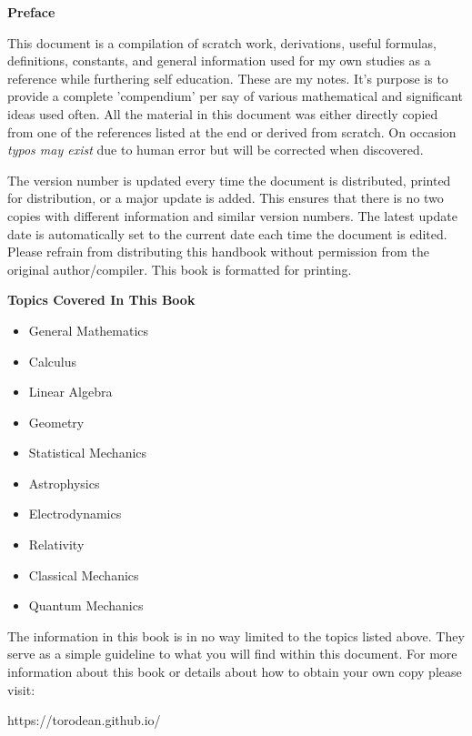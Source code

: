\begin{center}
	\textbf{Preface}
\end{center}

This document is a compilation of scratch work, derivations, useful formulas, definitions, constants, and general information used for my own studies as a reference while furthering self education. These are my notes. It's purpose is to provide a complete 'compendium' per say of various mathematical and significant ideas used often. All the material in this document was either directly copied from one of the references listed at the end or derived from scratch. On occasion \textit{typos may exist} due to human error but will be corrected when discovered.
	
The version number is updated every time the document is distributed, printed for distribution, or a major update is added. This ensures that there is no two copies with different information and similar version numbers. The latest update date is automatically set to the current date each time the document is edited. Please refrain from distributing this handbook without permission from the original author/compiler. This book is formatted for printing.

\begin{center}
	\textbf{Topics Covered In This Book}
\end{center}

\begin{multicols}{2}
\begin{itemize}
	\item General Mathematics
	\item Calculus
	\item Linear Algebra
	\item Geometry
	\item Statistical Mechanics
	\item Astrophysics
	\item Electrodynamics
	\item Relativity
	\item Classical Mechanics
	\item Quantum Mechanics
\end{itemize} 
\end{multicols}

The information in this book is in no way limited to the topics listed above. They serve as a simple guideline to what you will find within this document. For more information about this book or details about how to obtain your own copy please visit:
\begin{center}
	https://torodean.github.io/
\end{center}

